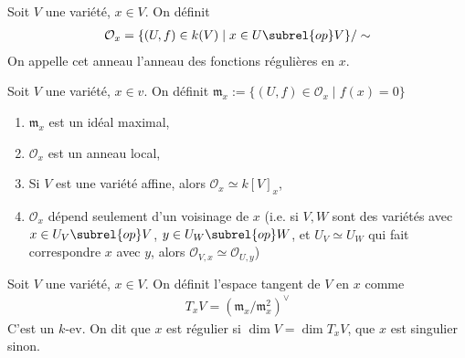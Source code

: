         \begin{defi}
            Soit $V$ une variété, $x \in V$. On définit
            \begin{align*}
                \mathcal{O}_x = \{(U,f) \in k(V) \mid x \in U \subrel{op} V\}/\sim
            \end{align*}
            On appelle cet anneau l'anneau des fonctions régulières en $x$.
        \end{defi}
        \begin{defi}
            Soit $V$ une variété, $x \in v$. On définit $\mathfrak{m}_x := \{(U,f) \in \mathcal{O}_x \mid f(x) = 0\}$
        \end{defi}
        \begin{exo}
            \begin{enumerate}
                \item $\mathfrak{m}_x$ est un idéal maximal,
                \item $\mathcal{O}_x$ est un anneau local,
                \item Si $V$ est une variété affine, alors $\mathcal{O}_x \simeq k[V]_x$,
                \item $\mathcal{O}_x$ dépend seulement d'un voisinage de $x$ (i.e. si $V,W$ sont des variétés avec $x \in U_V \subrel{op} V$, $y \in U_W \subrel{op} W$, et $U_V \simeq U_W$ qui fait correspondre $x$ avec $y$, alors $\mathcal{O}_{V,x} \simeq \mathcal{O}_{U,y}$)
            \end{enumerate}
        \end{exo}
        \begin{defi}
            Soit $V$ une variété, $x \in V$. On définit l'espace tangent de $V$ en $x$ comme 
            \begin{align*}
                T_xV = (\mathfrak{m}_x/\mathfrak{m}_x^2)^\vee
            \end{align*}
            C'est un $k$-ev. On dit que $x$ est régulier si $\dim V = \dim T_xV$, que $x$ est singulier sinon.
        \end{defi}

